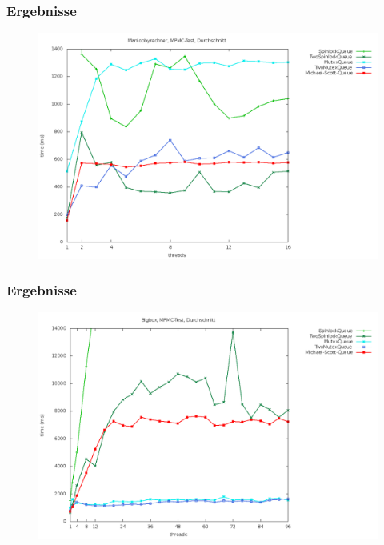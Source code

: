 \documentclass[svgnames]{beamer}
\begin{document}

\begin{frame}
\frametitle{Ergebnisse}
\begin {figure}
      \begin{center}
	\includegraphics[width=\textwidth]{manma.png}
     \end{center}
\end {figure}
\end{frame}

\begin{frame}
\frametitle{Ergebnisse}
\begin {figure}
      \begin{center}
	\includegraphics[width=\textwidth]{bigboxma.png}
     \end{center}
\end {figure}
\end{frame}
\end{document}
